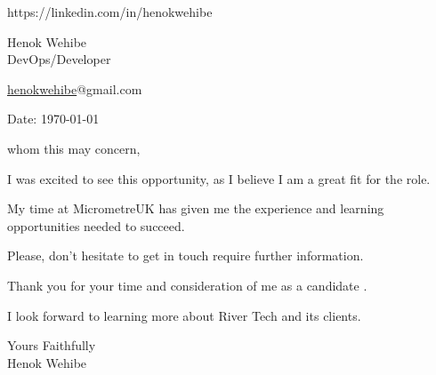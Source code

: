 \documentclass[11pt,a4]{article}
\begin{document}
\begin{center}
    \begin{minipage}[b]{0.28\textwidth}
            \large \href{mailtwwwwwwwo:youremail@email.com}{}https://linkedin.com/in/henokwehibe
    \end{minipage}%
    \begin{minipage}[b]{0.4\textwidth}
            \centering
            {\Huge Henok Wehibe} \\ %
            \vspace{0.1cm}
            {\color{UI_blue} \large{DevOps/Developer}} \\
    \end{minipage}%
    \begin{minipage}[b]{0.28\textwidth}
            \flushright \large
            {\href{https://www.linkedin.com/in/link/}{henokwehibe}@gmail.com } \\
            \href{https://Add_your_portfolio_here_}{}
    \end{minipage}   
    
\vspace{-0.15cm} 
{\color{UI_blue} \hrulefill}
\end{center}

\justify
\setlength{\parindent}{0pt}
\setlength{\parskip}{12pt}
\vspace{0.2cm}



Date: \today \par \vspace{-0.1cm}
whom this may concern, 

I was excited to see this opportunity, as I believe I am a great fit for the role. 

My time at MicrometreUK has given me the experience and learning opportunities needed to succeed. 

Please, don't hesitate to get in touch require further information.

Thank you for your time and consideration of me as a candidate . 

I look forward to learning more about River Tech and its clients.






\vspace{0.5cm}
\raggedright
Yours Faithfully \\ Henok Wehibe
\end{document}
